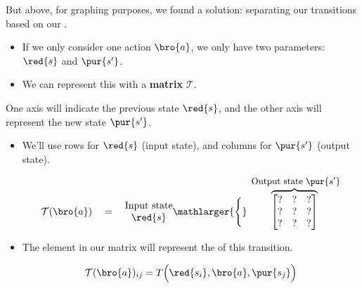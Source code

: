        But above, for graphing purposes, we found a solution: separating our transitions based on our .

       \begin{itemize}
           \item If we only consider one action $\bro{a}$, we only have two parameters: $\red{s}$ and $\pur{s'}$.
           \item We can represent this with a \textbf{matrix} $\mathcal{T}$.
       \end{itemize}

       One axis will indicate the previous state $\red{s}$, and the other axis will represent the new state $\pur{s'}$.
       
        \begin{itemize}
            \item We'll use rows for $\red{s}$ (input state), and columns for $\pur{s'}$ (output state).

            \begin{equation}
                \mathcal{T}(\bro{a}) 
                \quad = \quad
                \begin{matrix}
                    \text{Input } \text{state} \\ \red{s}
                \end{matrix}
                \mathlarger{\Bigg\{}
                \overbrace{
                    \begin{bmatrix}
                        ? & ? & ? \\
                        ? & ? & ? \\
                        ? & ? & ?
                    \end{bmatrix}
                    }^{\text{ \small Output state $\pur{s'}$}}
            \end{equation}
            
            \item The element in our matrix will represent the  of this transition.

            \begin{equation}
                \mathcal{T}(\bro{a})_{ij} = 
                T \Big( \red{s_i}, \bro{a}, \pur{s_j} \Big)
            \end{equation}
        \end{itemize}

